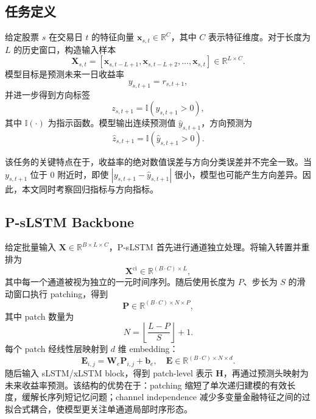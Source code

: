 \documentclass[UTF8,a4paper,twocolumn]{ctexart}
\begin{document}
\subsection{任务定义}

给定股票 $s$ 在交易日 $t$ 的特征向量 $\bm{x}_{s,t}\in \mathbb{R}^{C}$，其中 $C$ 表示特征维度。对于长度为 $L$ 的历史窗口，构造输入样本
\begin{equation}
  \bm{X}_{s,t}=\left[\bm{x}_{s,t-L+1},\bm{x}_{s,t-L+2},\ldots,\bm{x}_{s,t}\right]\in\mathbb{R}^{L\times C}.
\end{equation}
模型目标是预测未来一日收益率
\begin{equation}
  y_{s,t+1}=r_{s,t+1},
\end{equation}
并进一步得到方向标签
\begin{equation}
  z_{s,t+1}=\mathbb{I}\left(y_{s,t+1}>0\right),
\end{equation}
其中 $\mathbb{I}(\cdot)$ 为指示函数。模型输出连续预测值 $\hat y_{s,t+1}$，方向预测为
\begin{equation}
  \hat z_{s,t+1}=\mathbb{I}\left(\hat y_{s,t+1}>0\right).
\end{equation}

该任务的关键特点在于，收益率的绝对数值误差与方向分类误差并不完全一致。当 $y_{s,t+1}$ 位于 0 附近时，即使 $|y_{s,t+1}-\hat y_{s,t+1}|$ 很小，模型也可能产生方向差异。因此，本文同时考察回归指标与方向指标。

\subsection{P-sLSTM Backbone}

给定批量输入 $\bm{X}\in\mathbb{R}^{B\times L\times C}$，P-sLSTM 首先进行通道独立处理。将输入转置并重排为
\begin{equation}
  \bm{X}^{\mathrm{ci}}\in\mathbb{R}^{(B\cdot C)\times L},
\end{equation}
其中每一个通道被视为独立的一元时间序列。随后使用长度为 $P$、步长为 $S$ 的滑动窗口执行 patching，得到
\begin{equation}
  \bm{P}\in\mathbb{R}^{(B\cdot C)\times N\times P},
\end{equation}
其中 patch 数量为
\begin{equation}
  N=\left\lfloor \frac{L-P}{S}\right\rfloor+1.
\end{equation}
每个 patch 经线性层映射到 $d$ 维 embedding：
\begin{equation}
  \bm{E}_{i,j}=\bm{W}_{e}\bm{P}_{i,j}+\bm{b}_{e},\quad \bm{E}\in\mathbb{R}^{(B\cdot C)\times N\times d}.
\end{equation}
随后输入 sLSTM/xLSTM block，得到 patch-level 表示 $\bm{H}$，再通过预测头映射为未来收益率预测。该结构的优势在于：patching 缩短了单次递归建模的有效长度，缓解长序列短记忆问题；channel independence 减少多变量金融特征之间的过拟合式耦合，使模型更关注单通道局部时序形态。
\end{document}

